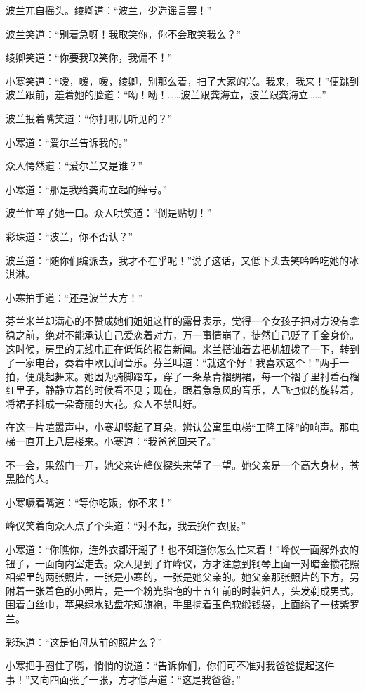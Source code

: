 \par 波兰兀自摇头。绫卿道：“波兰，少造谣言罢！”
\par 波兰笑道：“别着急呀！我取笑你，你不会取笑我么？”
\par 绫卿笑道：“你要我取笑你，我偏不！”
\par 小寒笑道：“嗳，嗳，嗳，绫卿，别那么着，扫了大家的兴。我来，我来！”便跳到波兰跟前，羞着她的脸道：“呦！呦！……波兰跟龚海立，波兰跟龚海立……”
\par 波兰抿着嘴笑道：“你打哪儿听见的？”
\par 小寒道：“爱尔兰告诉我的。”
\par 众人愕然道：“爱尔兰又是谁？”
\par 小寒道：“那是我给龚海立起的绰号。”
\par 波兰忙啐了她一口。众人哄笑道：“倒是贴切！”
\par 彩珠道：“波兰，你不否认？”
\par 波兰道：“随你们编派去，我才不在乎呢！”说了这话，又低下头去笑吟吟吃她的冰淇淋。
\par 小寒拍手道：“还是波兰大方！”
\par 芬兰米兰却满心的不赞成她们姐姐这样的露骨表示，觉得一个女孩子把对方没有拿稳之前，绝对不能承认自己爱恋着对方，万一事情崩了，徒然自己贬了千金身价。这时候，房里的无线电正在低低的报告新闻。米兰搭讪着去把机钮拨了一下，转到了一家电台，奏着中欧民间音乐。芬兰叫道：“就这个好！我喜欢这个！”两手一拍，便跳起舞来。她因为骑脚踏车，穿了一条茶青褶绸裙，每一个褶子里衬着石榴红里子，静静立着的时候看不见；现在，跟着急急风的音乐，人飞也似的旋转着，将裙子抖成一朵奇丽的大花。众人不禁叫好。
\par 在这一片喧嚣声中，小寒却竖起了耳朵，辨认公寓里电梯“工隆工隆”的响声。那电梯一直开上八层楼来。小寒道：“我爸爸回来了。”
\par 不一会，果然门一开，她父亲许峰仪探头来望了一望。她父亲是一个高大身材，苍黑脸的人。
\par 小寒噘着嘴道：“等你吃饭，你不来！”
\par 峰仪笑着向众人点了个头道：“对不起，我去换件衣服。”
\par 小寒道：“你瞧你，连外衣都汗潮了！也不知道你怎么忙来着！”峰仪一面解外衣的钮子，一面向内室走去。众人见到了许峰仪，方才注意到钢琴上面一对暗金攒花照相架里的两张照片，一张是小寒的，一张是她父亲的。她父亲那张照片的下方，另附着一张着色的小照片，是一个粉光脂艳的十五年前的时装妇人，头发剃成男式，围着白丝巾，苹果绿水钻盘花短旗袍，手里携着玉色软缎钱袋，上面绣了一枝紫罗兰。
\par 彩珠道：“这是伯母从前的照片么？”
\par 小寒把手圈住了嘴，悄悄的说道：“告诉你们，你们可不准对我爸爸提起这件事！”又向四面张了一张，方才低声道：“这是我爸爸。”
